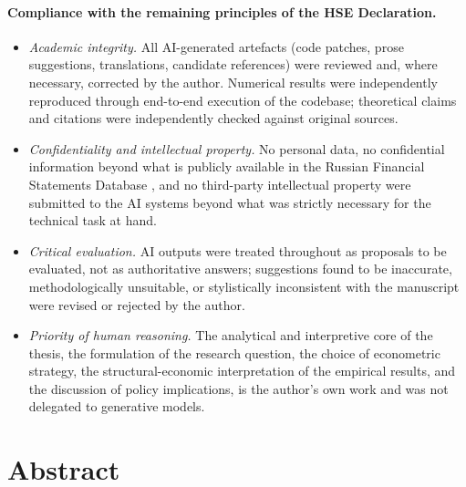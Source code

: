 \documentclass[a4paper, 12pt]{article}
\begin{document}
\paragraph{Compliance with the remaining principles of the HSE Declaration.}
\begin{itemize}
    \item \emph{Academic integrity.} All AI-generated artefacts (code patches, prose suggestions, translations, candidate references) were reviewed and, where necessary, corrected by the author. Numerical results were independently reproduced through end-to-end execution of the codebase; theoretical claims and citations were independently checked against original sources.
    \item \emph{Confidentiality and intellectual property.} No personal data, no confidential information beyond what is publicly available in the Russian Financial Statements Database \parencite{bondarkov2025russian}, and no third-party intellectual property were submitted to the AI systems beyond what was strictly necessary for the technical task at hand.
    \item \emph{Critical evaluation.} AI outputs were treated throughout as proposals to be evaluated, not as authoritative answers; suggestions found to be inaccurate, methodologically unsuitable, or stylistically inconsistent with the manuscript were revised or rejected by the author.
    \item \emph{Priority of human reasoning.} The analytical and interpretive core of the thesis, the formulation of the research question, the choice of econometric strategy, the structural-economic interpretation of the empirical results, and the discussion of policy implications, is the author's own work and was not delegated to generative models.
\end{itemize}


\section{Abstract}
\end{document}
